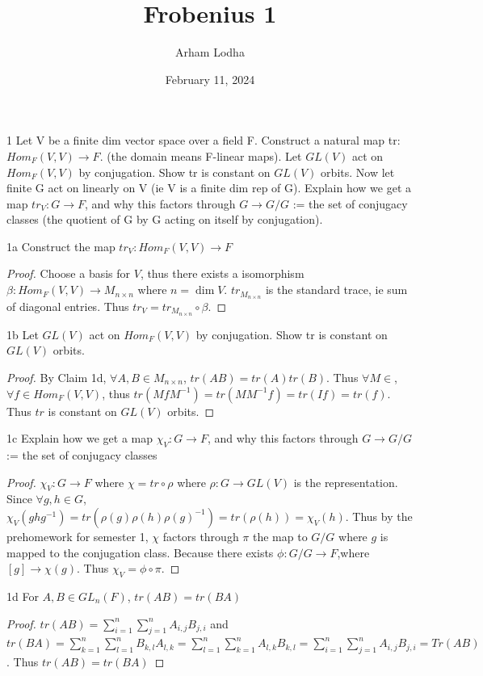 \documentclass{article}
\begin{document}
\title{Frobenius 1}
\author{Arham Lodha}%
\date{February 11, 2024}%
\maketitle

\begin{PROB}{1}\label{Problem 1.}
    Let V be a finite dim vector space over a field F. Construct a natural map tr: $Hom_F(V,V) \to F$. (the domain means F-linear maps). Let $GL(V)$ act on $Hom_F(V,V)$ by conjugation. Show tr is constant on $GL(V)$ orbits. Now let finite G act on linearly on V (ie V is a finite dim rep of G). Explain how we get a map $tr_V: G \to F$, and why this factors through $G \to G/G$ := the set of conjugacy classes (the quotient of G by G acting on itself by conjugation).
\end{PROB}
\begin{claim}{1a}\label{Claim 1a.}
    Construct the map $tr_V: Hom_F(V, V) \to F$ 
\end{claim}
\begin{proof}
    Choose a basis for $V$, thus there exists a isomorphism $\beta: Hom_F(V, V) \to M_{n \times n}$ where $n = \dim V$. $tr_{M_{n \times n}}$ is the standard trace, ie sum of diagonal entries. Thus $tr_V = tr_{M_{n \times n}} \circ \beta$.    
\end{proof}
\begin{claim}{1b}\label{Claim 1b.}
    Let $GL(V)$ act on $Hom_F(V,V)$ by conjugation. Show tr is constant on $GL(V)$ orbits.
\end{claim}
\begin{proof}
    By Claim 1d, $\forall A, B \in M_{n \times n}$, $tr(AB) = tr(A)tr(B)$. Thus $\forall M \in $, $\forall f \in Hom_F(V, V)$, thus $tr(MfM^{-1}) = tr(MM^{-1}f) = tr(If) = tr(f)$. Thus $tr$ is constant on $GL(V)$ orbits.      
\end{proof}
\begin{claim}{1c}\label{Claim 1c.}
    Explain how we get a map $\chi_V: G \to F$, and why this factors through $G \to G/G$ := the set of conjugacy classes
\end{claim}
\begin{proof}
    $\chi_V : G \to F$ where $\chi = tr \circ \rho$ where $\rho: G \to GL(V)$ is the representation. Since $\forall g, h \in G$, $\chi_V(ghg^{-1}) = tr(\rho(g)\rho(h)\rho(g)^{-1}) = tr(\rho(h))= \chi_V(h)$. Thus by the prehomework for semester 1, $\chi$ factors through $\pi$ the map to $G / G$ where $g$ is mapped to the conjugation class. Because there exists $\phi: G / G \to F$,where $[g] \to \chi(g)$. Thus $\chi_V = \phi \circ \pi$.                
\end{proof}
\begin{claim}{1d}\label{Claim 3a.i.}
    For $A, B \in GL_n(F)$, $tr(AB) = tr(BA)$
\end{claim}
\begin{proof}
    $tr(AB) = \sum_{i = 1}^{n} \sum_{j = 1}^{n} A_{i, j} B_{j, i}$ and $tr(BA) = \sum_{k = 1}^{n} \sum_{l = 1}^{n} B_{k, l} A_{l, k} = \sum_{l = 1}^{n} \sum_{k = 1}^{n} A_{l, k} B_{k, l} = \sum_{i = 1}^{n} \sum_{j = 1}^{n} A_{i, j} B_{j, i} = Tr(AB)$. Thus $tr(AB) = tr(BA)$
\end{proof}
\end{document}
